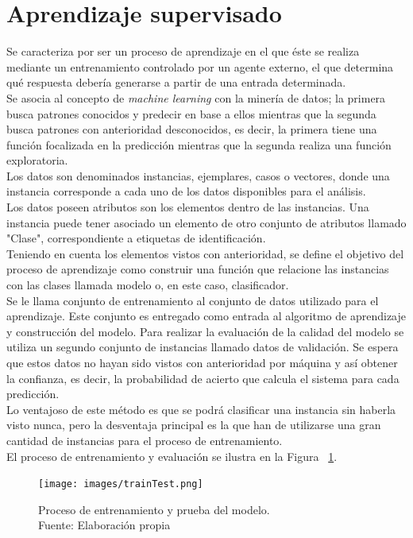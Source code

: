 \section{Aprendizaje supervisado}
\label{sec:aprendSuperv}
Se caracteriza por ser un proceso de aprendizaje en el que éste se realiza mediante un entrenamiento controlado por un agente externo, el que determina qué respuesta debería generarse a partir de una entrada determinada.\\
Se asocia al concepto de \textit{machine learning} con la minería de datos; la primera busca patrones conocidos y predecir en base a ellos mientras que la segunda busca patrones con anterioridad desconocidos, es decir, la primera tiene una función focalizada en la predicción mientras que la segunda realiza una función exploratoria.\\
Los datos son denominados instancias, ejemplares, casos o vectores, donde una instancia corresponde a cada uno de los datos disponibles para el análisis.\\
Los datos poseen atributos son los elementos dentro de las instancias. Una instancia puede tener asociado un elemento de otro conjunto de atributos llamado "Clase", correspondiente a etiquetas de identificación.\\
Teniendo en cuenta los elementos vistos con anterioridad, se define el objetivo del proceso de aprendizaje como construir una función que relacione las instancias con las clases llamada modelo o, en este caso, clasificador.\\
Se le llama conjunto de entrenamiento al conjunto de datos utilizado para el aprendizaje. Este conjunto es entregado como entrada al algoritmo de aprendizaje y construcción del modelo. Para realizar la evaluación de la calidad del modelo se utiliza un segundo conjunto de instancias llamado datos de validación. Se espera que estos datos no hayan sido vistos con anterioridad por máquina y así obtener la confianza, es decir, la probabilidad de acierto que calcula el sistema para cada predicción.\\

Lo ventajoso de este método es que se podrá clasificar una instancia sin haberla visto nunca, pero la desventaja principal es la que han de utilizarse una gran cantidad de instancias para el proceso de entrenamiento.\\

El proceso de entrenamiento y evaluación se ilustra en la Figura ~\ref{fig:entrenamientoEvaluacion}.

\begin{figure}[!ht]
	\centering
	\captionsetup{justification=centering}
	\texttt{[image: images/trainTest.png]}
	\caption[Proceso de entrenamiento y prueba del modelo.]{Proceso de entrenamiento y prueba del modelo.\\Fuente: Elaboraci\'on propia}
	\label{fig:entrenamientoEvaluacion}
\end{figure}

